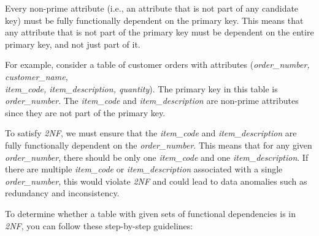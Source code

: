 Every non-prime attribute (i.e., an attribute that is not part of any candidate key) must be fully functionally dependent on the primary key. This means that any attribute that is not part of the primary key must be dependent on the entire primary key, and not just part of it.

For example, consider a table of customer orders with attributes (\textit{order\_number, customer\_name,\\ item\_code, item\_description, quantity}). The primary key in this table is \textit{order\_number}. The \textit{item\_code} and \textit{item\_description} are non-prime attributes since they are not part of the primary key.

To satisfy \textit{2NF}, we must ensure that the \textit{item\_code} and \textit{item\_description} are fully functionally dependent on the \textit{order\_number}. This means that for any given \textit{order\_number}, there should be only one \textit{item\_code} and one \textit{item\_description}. If there are multiple \textit{item\_code} or \textit{item\_description} associated with a single \textit{order\_number}, this would violate \textit{2NF} and could lead to data anomalies such as redundancy and inconsistency.

To determine whether a table with given sets of functional dependencies is in \textit{2NF}, you can follow these step-by-step guidelines:

